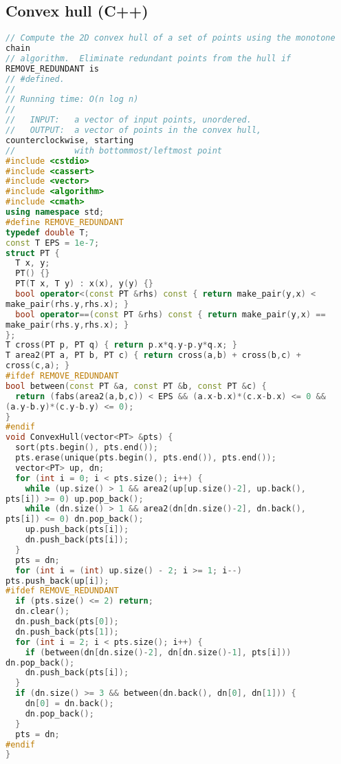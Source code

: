 \subsection{Convex hull (C++)}
\begin{lstlisting}[language=C++]
// Compute the 2D convex hull of a set of points using the monotone 
chain
// algorithm.  Eliminate redundant points from the hull if 
REMOVE_REDUNDANT is 
// #defined.
//
// Running time: O(n log n)
//
//   INPUT:   a vector of input points, unordered.
//   OUTPUT:  a vector of points in the convex hull, 
counterclockwise, starting
//            with bottommost/leftmost point
#include <cstdio>
#include <cassert>
#include <vector>
#include <algorithm>
#include <cmath>
using namespace std;
#define REMOVE_REDUNDANT
typedef double T;
const T EPS = 1e-7;
struct PT { 
  T x, y; 
  PT() {} 
  PT(T x, T y) : x(x), y(y) {}
  bool operator<(const PT &rhs) const { return make_pair(y,x) < 
make_pair(rhs.y,rhs.x); }
  bool operator==(const PT &rhs) const { return make_pair(y,x) == 
make_pair(rhs.y,rhs.x); }
};
T cross(PT p, PT q) { return p.x*q.y-p.y*q.x; }
T area2(PT a, PT b, PT c) { return cross(a,b) + cross(b,c) + 
cross(c,a); }
#ifdef REMOVE_REDUNDANT
bool between(const PT &a, const PT &b, const PT &c) {
  return (fabs(area2(a,b,c)) < EPS && (a.x-b.x)*(c.x-b.x) <= 0 && 
(a.y-b.y)*(c.y-b.y) <= 0);
}
#endif
void ConvexHull(vector<PT> &pts) {
  sort(pts.begin(), pts.end());
  pts.erase(unique(pts.begin(), pts.end()), pts.end());
  vector<PT> up, dn;
  for (int i = 0; i < pts.size(); i++) {
    while (up.size() > 1 && area2(up[up.size()-2], up.back(), 
pts[i]) >= 0) up.pop_back();
    while (dn.size() > 1 && area2(dn[dn.size()-2], dn.back(), 
pts[i]) <= 0) dn.pop_back();
    up.push_back(pts[i]);
    dn.push_back(pts[i]);
  }
  pts = dn;
  for (int i = (int) up.size() - 2; i >= 1; i--) 
pts.push_back(up[i]);
#ifdef REMOVE_REDUNDANT
  if (pts.size() <= 2) return;
  dn.clear();
  dn.push_back(pts[0]);
  dn.push_back(pts[1]);
  for (int i = 2; i < pts.size(); i++) {
    if (between(dn[dn.size()-2], dn[dn.size()-1], pts[i])) 
dn.pop_back();
    dn.push_back(pts[i]);
  }
  if (dn.size() >= 3 && between(dn.back(), dn[0], dn[1])) {
    dn[0] = dn.back();
    dn.pop_back();
  }
  pts = dn;
#endif
}
\end{lstlisting}
